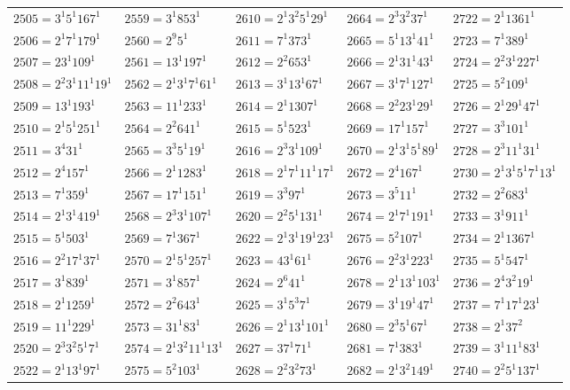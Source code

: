 {\begin{longtable}[c]{*{5}{l}}
$2505=3^{1}5^{1}167^{1}$&$2559=3^{1}853^{1}$&$2610=2^{1}3^{2}5^{1}29^{1}$&$2664=2^{3}3^{2}37^{1}$&$2722=2^{1}1361^{1}$\\
$2506=2^{1}7^{1}179^{1}$&$2560=2^{9}5^{1}$&$2611=7^{1}373^{1}$&$2665=5^{1}13^{1}41^{1}$&$2723=7^{1}389^{1}$\\
$2507=23^{1}109^{1}$&$2561=13^{1}197^{1}$&$2612=2^{2}653^{1}$&$2666=2^{1}31^{1}43^{1}$&$2724=2^{2}3^{1}227^{1}$\\
$2508=2^{2}3^{1}11^{1}19^{1}$&$2562=2^{1}3^{1}7^{1}61^{1}$&$2613=3^{1}13^{1}67^{1}$&$2667=3^{1}7^{1}127^{1}$&$2725=5^{2}109^{1}$\\
$2509=13^{1}193^{1}$&$2563=11^{1}233^{1}$&$2614=2^{1}1307^{1}$&$2668=2^{2}23^{1}29^{1}$&$2726=2^{1}29^{1}47^{1}$\\
$2510=2^{1}5^{1}251^{1}$&$2564=2^{2}641^{1}$&$2615=5^{1}523^{1}$&$2669=17^{1}157^{1}$&$2727=3^{3}101^{1}$\\
$2511=3^{4}31^{1}$&$2565=3^{3}5^{1}19^{1}$&$2616=2^{3}3^{1}109^{1}$&$2670=2^{1}3^{1}5^{1}89^{1}$&$2728=2^{3}11^{1}31^{1}$\\
$2512=2^{4}157^{1}$&$2566=2^{1}1283^{1}$&$2618=2^{1}7^{1}11^{1}17^{1}$&$2672=2^{4}167^{1}$&$2730=2^{1}3^{1}5^{1}7^{1}13^{1}$\\
$2513=7^{1}359^{1}$&$2567=17^{1}151^{1}$&$2619=3^{3}97^{1}$&$2673=3^{5}11^{1}$&$2732=2^{2}683^{1}$\\
$2514=2^{1}3^{1}419^{1}$&$2568=2^{3}3^{1}107^{1}$&$2620=2^{2}5^{1}131^{1}$&$2674=2^{1}7^{1}191^{1}$&$2733=3^{1}911^{1}$\\
$2515=5^{1}503^{1}$&$2569=7^{1}367^{1}$&$2622=2^{1}3^{1}19^{1}23^{1}$&$2675=5^{2}107^{1}$&$2734=2^{1}1367^{1}$\\
$2516=2^{2}17^{1}37^{1}$&$2570=2^{1}5^{1}257^{1}$&$2623=43^{1}61^{1}$&$2676=2^{2}3^{1}223^{1}$&$2735=5^{1}547^{1}$\\
$2517=3^{1}839^{1}$&$2571=3^{1}857^{1}$&$2624=2^{6}41^{1}$&$2678=2^{1}13^{1}103^{1}$&$2736=2^{4}3^{2}19^{1}$\\
$2518=2^{1}1259^{1}$&$2572=2^{2}643^{1}$&$2625=3^{1}5^{3}7^{1}$&$2679=3^{1}19^{1}47^{1}$&$2737=7^{1}17^{1}23^{1}$\\
$2519=11^{1}229^{1}$&$2573=31^{1}83^{1}$&$2626=2^{1}13^{1}101^{1}$&$2680=2^{3}5^{1}67^{1}$&$2738=2^{1}37^{2}$\\
$2520=2^{3}3^{2}5^{1}7^{1}$&$2574=2^{1}3^{2}11^{1}13^{1}$&$2627=37^{1}71^{1}$&$2681=7^{1}383^{1}$&$2739=3^{1}11^{1}83^{1}$\\
$2522=2^{1}13^{1}97^{1}$&$2575=5^{2}103^{1}$&$2628=2^{2}3^{2}73^{1}$&$2682=2^{1}3^{2}149^{1}$&$2740=2^{2}5^{1}137^{1}$\\

\end{longtable}}

